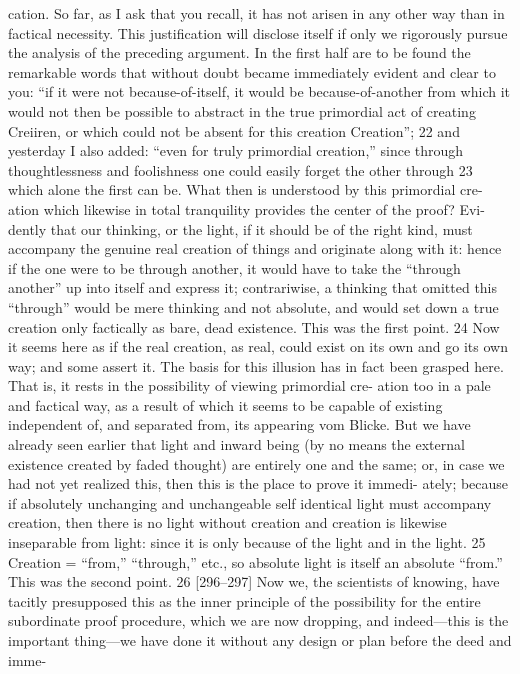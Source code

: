 cation. So far, as I ask that you recall, it has not arisen in any other way than
in factical necessity.
This justification will disclose itself if only we rigorously pursue the
analysis of the preceding argument. In the first half are to be found the
remarkable words that without doubt became immediately evident and clear
to you: “if it were not because-of-itself, it would be because-of-another from
which it would not then be possible to abstract in the true primordial act of
creating {Creiiren}, or which could not be absent for this creation {Creation}”; 22
and yesterday I also added: “even for truly primordial creation,” since through
thoughtlessness and foolishness one could easily forget the other through 23
which alone the first can be. What then is understood by this primordial cre-
ation which likewise in total tranquility provides the center of the proof? Evi-
dently that our thinking, or the light, if it should be of the right kind, must
accompany the genuine real creation of things and originate along with it:
hence if the one were to be through another, it would have to take the
“through another” up into itself and express it; contrariwise, a thinking that
omitted this “through” would be mere thinking and not absolute, and would
set down a true creation only factically as bare, dead existence. This was the
first point. 24
Now it seems here as if the real creation, as real, could exist on its own
and go its own way; and some assert it. The basis for this illusion has in fact
been grasped here. That is, it rests in the possibility of viewing primordial cre-
ation too in a pale and factical way, as a result of which it seems to be capable
of existing independent of, and separated from, its appearing {vom Blicke}. But
we have already seen earlier that light and inward being (by no means the
external existence created by faded thought) are entirely one and the same; or,
in case we had not yet realized this, then this is the place to prove it immedi-
ately; because if absolutely unchanging and unchangeable self identical light
must accompany creation, then there is no light without creation and creation
is likewise inseparable from light: since it is only because of the light and in the
light. 25 Creation = “from,” “through,” etc., so absolute light is itself an absolute
“from.” This was the second point. 26
[296–297] Now we, the scientists of knowing, have tacitly presupposed
this as the inner principle of the possibility for the entire subordinate proof
procedure, which we are now dropping, and indeed—this is the important
thing—we have done it without any design or plan before the deed and imme-
